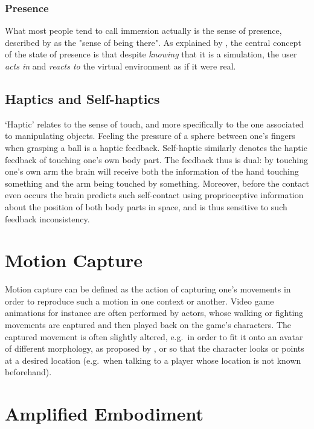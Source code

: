 \subsubsection{Presence}
What most people tend to call immersion actually is the sense of presence, described by \cite{held1992telepresence,slater1993representations} as the "sense of being there". As explained by \cite{debarba2017embodiment}, the central concept of the state of presence is that despite \textit{knowing} that it is a simulation, the user \textit{acts in} and \textit{reacts to} the virtual environment as if it were real.

\subsection{Haptics and Self-haptics}

`Haptic' relates to the sense of touch, and more specifically to the one associated to manipulating objects. Feeling the pressure of a sphere between one's fingers when grasping a ball is a haptic feedback. Self-haptic similarly denotes the haptic feedback of touching one's own body part. The feedback thus is dual: by touching one's own arm the brain will receive both the information of the hand touching something and the arm being touched by something. Moreover, before the contact even occurs the brain predicts such self-contact using proprioceptive information about the position of both body parts in space, and is thus sensitive to such feedback inconsistency.

\section{Motion Capture}
\label{sec:mocap}
Motion capture can be defined as the action of capturing one's movements in order to reproduce such a motion in one context or another. Video game animations for instance are often performed by actors, whose walking or fighting movements are captured and then played back on the game's characters. The captured movement is often slightly altered, e.g.\ in order to fit it onto an avatar of different morphology, as proposed by \cite{molla2017egocentric}, or so that the character looks or points at a desired location (e.g.\ when talking to a player whose location is not known beforehand).

\section{Amplified Embodiment}

